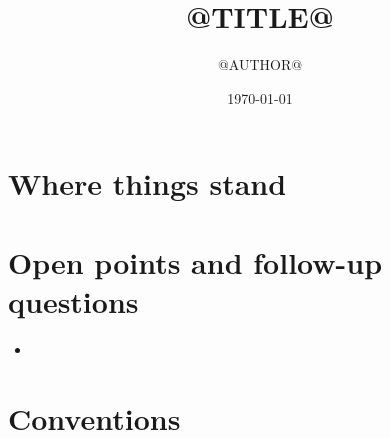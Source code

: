 \documentclass[11pt,a4paper]{article}
\title{@TITLE@}
\author{@AUTHOR@}
\date{\today}
\begin{document}
\maketitle

\section*{Where things stand}

\berryoverview

%


\section*{Open points and follow-up questions}
\begin{itemize}
  \item %
\end{itemize}


\appendix
\section{Conventions}
\berryconventions
\end{document}
